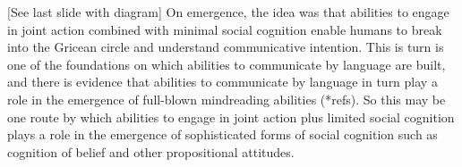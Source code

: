 \documentclass[12pt,a4paper]{extarticle}
\begin{document}
[See last slide with diagram] On emergence, the idea was that abilities to engage in joint action combined with minimal social cognition enable humans to break into the Gricean circle and understand communicative intention.
This is turn is one of the foundations on which abilities to communicate by language are built,
and there is evidence that abilities to communicate by language in turn play a role in the emergence of full-blown mindreading abilities (*refs).
So this may be one route by which abilities to engage in joint action plus limited social cognition plays a role in the emergence of sophisticated forms of social cognition such as cognition of belief and other propositional attitudes.








\end{document}
